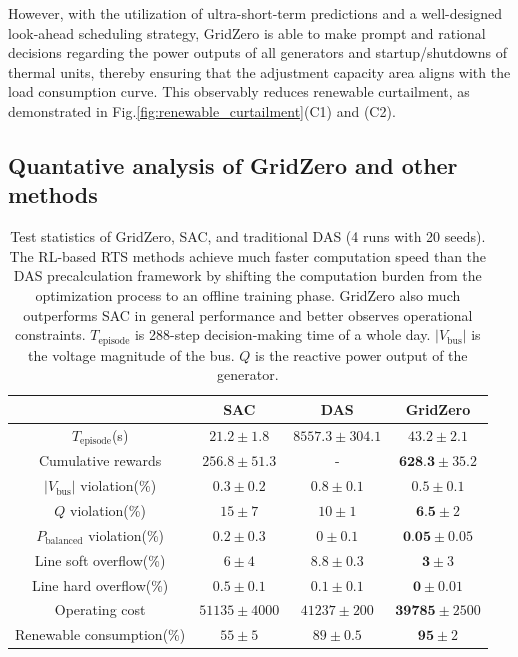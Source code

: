 However, with the utilization of ultra-short-term predictions and a well-designed look-ahead scheduling strategy, GridZero is able to make prompt and rational decisions regarding the power outputs of all generators and startup/shutdowns of thermal units, thereby ensuring that the adjustment capacity area aligns with the load consumption curve. This observably reduces renewable curtailment, as demonstrated in Fig.\ref{fig:renewable_curtailment}(C1) and (C2). 

\subsection*{Quantative analysis of GridZero and other methods}

\begin{table}[h]
\centering
\caption{Test statistics of GridZero, SAC, and traditional DAS (4 runs with 20 seeds). The RL-based RTS methods achieve much faster computation speed than the DAS precalculation framework by shifting the computation burden from the optimization process to an offline training phase. GridZero also much outperforms SAC in general performance and better observes operational constraints. $T_\text{episode}$ is 288-step decision-making time of a whole day. $\vert V_\text{bus}\vert$ is the voltage magnitude of the bus. $Q$ is the reactive power output of the generator.}
\begin{tabular}{cccc}
    \toprule
      & SAC & DAS & \textbf{GridZero} \\
    \midrule
    $T_{\text{episode}}$(s) & $21.2\pm{1.8}$ & $8557.3\pm{304.1}$ & $43.2\pm{2.1}$ \\
    Cumulative rewards & $256.8\pm{51.3}$ & 
    -
    & $\textbf{628.3}\pm{35.2}$ \\
    $\vert V_\text{bus}\vert$ violation(\%) & $0.3\pm{0.2}$ & $0.8\pm{0.1}$ & $0.5\pm{0.1}$ \\
    $Q$ violation(\%) & $15\pm{7}$ & $10\pm{1}$ & $\textbf{6.5}\pm{2}$ \\
    $P_{\text{balanced}}$ violation(\%) & $0.2\pm{0.3}$ & $0\pm{0.1}$ & $\textbf{0.05}\pm{0.05}$ \\
    Line soft overflow(\%) & $6\pm{4}$ & $8.8\pm{0.3}$ & $\textbf{3}\pm{3}$ \\
    Line hard overflow(\%) & $0.5\pm{0.1}$ & $0.1\pm{0.1}$ & $\textbf{0}\pm{0.01}$ \\
    Operating cost & $51135\pm{4000}$ & $41237\pm{200}$ & $\textbf{39785}\pm{2500}$ \\
    Renewable consumption(\%) & $55\pm{5}$ & $89\pm{0.5}$ & $\textbf{95}\pm{2}$\\
    \bottomrule
  \end{tabular}
  \label{tab:statitics}
\end{table}


